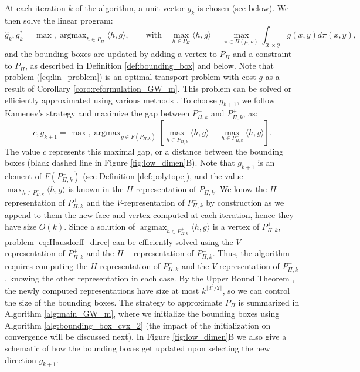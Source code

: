 \documentclass{article}
\newcommand{\Y}{\mathcal{Y}}
\newcommand{\X}{\mathcal{X}}
\newcommand{\1}{\mathbf{1}}
\DeclareMathOperator*{\argmax}{argmax}
\theoremstyle{definition}
\theoremstyle{remark}
\begin{document}
At each iteration $k$ of the algorithm, a unit vector $g_k$ is chosen (see below). We then solve the linear program: 
\begin{equation} \label{eq:lin_problem}
\hat{g}_k, g^*_k = \max, \argmax_{h\in P_\Pi}\langle h,g\rangle, \qquad \textrm{with} \quad \max_{h\in P_\Pi} \langle h,g\rangle =\max_{\pi\in\Pi(\mu,\nu)}\int_{\X\times\Y} g(x,y)d\pi(x,y),
\end{equation}
and the bounding boxes are updated by adding a vertex to $P_\Pi^-$ and a constraint to $P_\Pi^+$, as described in Definition \ref{def:bounding_box} and below.
Note that problem (\ref{eq:lin_problem}) is an optimal transport problem with cost $g$ as a result of Corollary \ref{coro:reformulation_GW_m}. This problem can be solved or efficiently approximated using various methods \cite{cuturi2013sinkhorn,peyre2019computational,flamary2021pot,flamary2024pot,cuturi2022optimal}. To choose $g_{k+1}$, we follow Kamenev's strategy \cite{lammel2023convergence,kamenev1996algorithm} and maximize the gap between $P_{\Pi,k}^-$ and $P_{\Pi,k}^+$, as:
\begin{equation}\label{eq:Hausdorff_direc}
    c,g_{k+1} = \max,\argmax_{g\in F(P_{\Pi,k}^-)} [\max_{h\in P_{\Pi,k}^+}\langle h,g\rangle - \max_{h\in P_{\Pi,k}^-}\langle h,g\rangle].
\end{equation}
The value $c$ represents this maximal gap, or a distance between the bounding boxes \cite{lammel2023convergence} (black dashed line in Figure \ref{fig:low_dimen}B). Note that $g_{k+1}$ is an element of $ F(P_{\Pi,k}^-)$ (see Definition \ref{def:polytope}), and the value $\max_{h\in P_{\Pi,k}^-}\langle h,g\rangle$ is known in the $H$-representation of $P_{\Pi,k}^-$. We know the $H$-representation of $P_{\Pi,k}^+$ and the $V$-representation of $P_{\Pi,k}^-$ by construction as we append to them the new face and vertex computed at each iteration, hence they have size $O(k)$. Since a solution of $\argmax_{h\in P_{\Pi,k}^+}\langle h,g\rangle$ is a vertex of $P_{\Pi,k}^+$, problem \eqref{eq:Hausdorff_direc} can be efficiently solved using the $V-$representation of $P_{\Pi,k}^+$ and the $H-$representation of $P_{\Pi,k}^-$. Thus, the algorithm requires computing the $H$-representation of $P_{\Pi,k}^-$ and the $V$-representation of $P_{\Pi,k}^+$, knowing the other representation in each case.  By the Upper Bound Theorem \cite[Section 5.5]{matouvsek2002lectures}, 
the newly computed representations have size at most $k^{\lfloor d^2/2\rfloor}$, so we can control the size of the bounding boxes. The strategy to approximate $P_\Pi$ is summarized in Algorithm \ref{alg:main_GW_m}, where we initialize the bounding boxes using Algorithm \ref{alg:bounding_box_cvx_2} (the impact of the initialization on convergence will be discussed next). In Figure \ref{fig:low_dimen}B we also give a schematic of how the bounding boxes get updated upon selecting the new direction $g_{k+1}$. 
\end{document}

